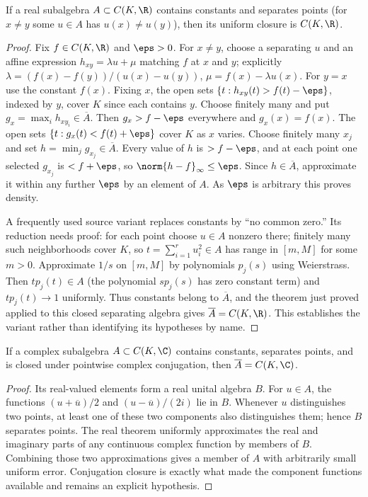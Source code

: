 \begin{theorem}
If a real subalgebra $A\subset C(K,\R)$ contains constants and separates points (for $x\ne y$ some $u\in A$ has $u(x)\ne u(y)$), then its uniform closure is $C(K,\R)$.
\end{theorem}
\begin{proof}
Fix $f\in C(K,\R)$ and $\eps>0$. For $x\ne y$, choose a separating $u$ and an affine expression $h_{xy}=\lambda u+\mu$ matching $f$ at $x$ and $y$; explicitly $\lambda=(f(x)-f(y))/(u(x)-u(y))$, $\mu=f(x)-\lambda u(x)$. For $y=x$ use the constant $f(x)$. Fixing $x$, the open sets $\{t:h_{xy}(t)>f(t)-\eps\}$, indexed by $y$, cover $K$ since each contains $y$. Choose finitely many and put $g_x=\max_i h_{xy_i}\in\overline A$. Then $g_x>f-\eps$ everywhere and $g_x(x)=f(x)$. The open sets $\{t:g_x(t)<f(t)+\eps\}$ cover $K$ as $x$ varies. Choose finitely many $x_j$ and set $h=\min_jg_{x_j}\in\overline A$. Every value of $h$ is $>f-\eps$, and at each point one selected $g_{x_j}$ is $<f+\eps$, so $\norm{h-f}_\infty\leq\eps$. Since $h\in\overline A$, approximate it within any further $\eps$ by an element of $A$. As $\eps$ is arbitrary this proves density.

A frequently used source variant replaces constants by ``no common zero.'' Its reduction needs proof: for each point choose $u\in A$ nonzero there; finitely many such neighborhoods cover $K$, so $t=\sum_{i=1}^ru_i^2\in A$ has range in $[m,M]$ for some $m>0$. Approximate $1/s$ on $[m,M]$ by polynomials $p_j(s)$ using Weierstrass. Then $t p_j(t)\in A$ (the polynomial $s p_j(s)$ has zero constant term) and $t p_j(t)\to1$ uniformly. Thus constants belong to $\overline A$, and the theorem just proved applied to this closed separating algebra gives $\overline A=C(K,\R)$. This establishes the variant rather than identifying its hypotheses by name.
\end{proof}

\begin{theorem}
If a complex subalgebra $A\subset C(K,\C)$ contains constants, separates points, and is closed under pointwise complex conjugation, then $\overline A=C(K,\C)$.
\end{theorem}
\begin{proof}
Its real-valued elements form a real unital algebra $B$. For $u\in A$, the functions $(u+\overline u)/2$ and $(u-\overline u)/(2i)$ lie in $B$. Whenever $u$ distinguishes two points, at least one of these two components also distinguishes them; hence $B$ separates points. The real theorem uniformly approximates the real and imaginary parts of any continuous complex function by members of $B$. Combining those two approximations gives a member of $A$ with arbitrarily small uniform error. Conjugation closure is exactly what made the component functions available and remains an explicit hypothesis.
\end{proof}

